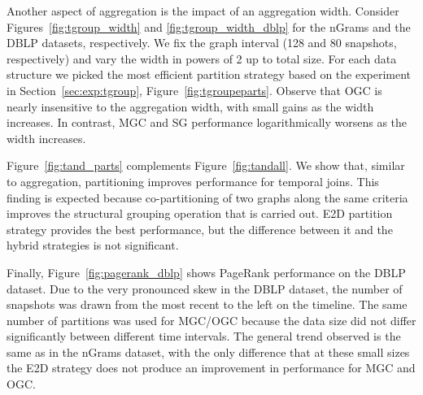 Another aspect of aggregation is the impact of an aggregation width.
Consider Figures~\ref{fig:tgroup_width} and
\ref{fig:tgroup_width_dblp} for the nGrams and the DBLP datasets,
respectively.  We fix the graph interval (128 and 80 snapshots,
respectively) and vary the width in powers of 2 up to total size.  For
each data structure we picked the most efficient partition strategy
based on the experiment in Section~\ref{sec:exp:tgroup},
Figure~\ref{fig:tgroupeparts}.  Observe that OGC is nearly insensitive
to the aggregation width, with small gains as the width increases.  In
contrast, MGC and SG performance logarithmically worsens as the width
increases.

Figure~\ref{fig:tand_parts} complements Figure~\ref{fig:tandall}.  We
show that, similar to aggregation, partitioning improves performance
for temporal joins.  This finding is expected because co-partitioning
of two graphs along the same criteria improves the structural grouping
operation that is carried out. E2D partition strategy provides the
best performance, but the difference between it and the hybrid
strategies is not significant.

Finally, Figure~\ref{fig:pagerank_dblp} shows PageRank performance on
the DBLP dataset. Due to the very pronounced skew in the DBLP dataset,
the number of snapshots was drawn from the most recent to the left on
the timeline.  The same number of partitions was used for MGC/OGC
because the data size did not differ significantly between different
time intervals.  The general trend observed is the same as in the
nGrams dataset, with the only difference that at these small sizes the
E2D strategy does not produce an improvement in performance for MGC
and OGC.
